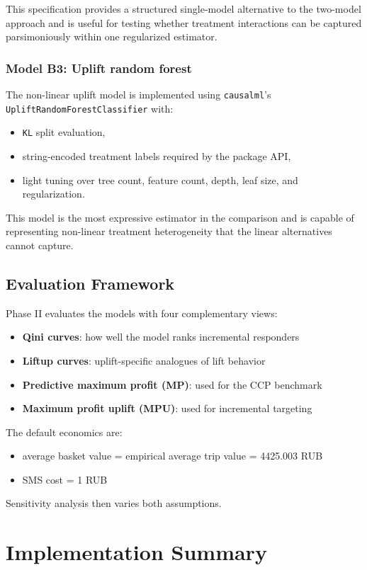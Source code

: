 \documentclass[11pt,a4paper]{article}
\begin{document}
This specification provides a structured single-model alternative to the two-model approach and is useful for testing whether treatment interactions can be captured parsimoniously within one regularized estimator.

\subsubsection{Model B3: Uplift random forest}
The non-linear uplift model is implemented using \texttt{causalml}'s \texttt{UpliftRandomForestClassifier} with:
\begin{itemize}
    \item \texttt{KL} split evaluation,
    \item string-encoded treatment labels required by the package API,
    \item light tuning over tree count, feature count, depth, leaf size, and regularization.
\end{itemize}

This model is the most expressive estimator in the comparison and is capable of representing non-linear treatment heterogeneity that the linear alternatives cannot capture.

\subsection{Evaluation Framework}
Phase II evaluates the models with four complementary views:
\begin{itemize}
    \item \textbf{Qini curves}: how well the model ranks incremental responders
    \item \textbf{Liftup curves}: uplift-specific analogues of lift behavior
    \item \textbf{Predictive maximum profit (MP)}: used for the CCP benchmark
    \item \textbf{Maximum profit uplift (MPU)}: used for incremental targeting
\end{itemize}

The default economics are:
\begin{itemize}
    \item average basket value = empirical average trip value = 4425.003 RUB
    \item SMS cost = 1 RUB
\end{itemize}

Sensitivity analysis then varies both assumptions.

\section{Implementation Summary}
\end{document}
